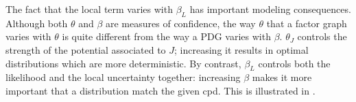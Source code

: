 \documentclass[letterpaper]{article} %
\theoremstyle{plain}
\theoremstyle{definition}
\theoremstyle{remark}
\begin{document}
The fact that the local term varies with $\beta_L$ has important modeling consequences.
Although both $\theta$ and $\beta$ are measures of confidence, 
the way $\theta$ that a factor graph varies with $\theta$ 
is quite different from the way a PDG
varies with $\beta$. 
$\theta_J$ controls the strength of the potential associated to $J$; increasing it results in optimal distributions which are more deterministic. 
By contrast, $\beta_L$ controls both the likelihood and the local uncertainty together:
increasing $\beta$  makes it more important that a distribution match the given cpd. This is illustrated in .
\end{document}
